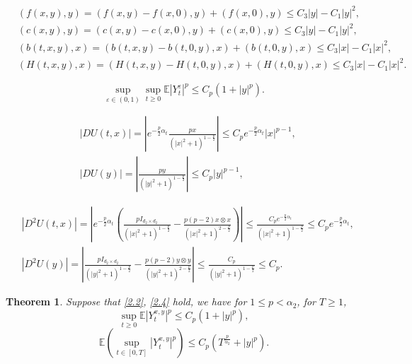\documentclass[10pt,a4paper]{amsart}
\newtheorem{theorem}{Theorem}
\begin{document}
\begin{equation}\label{2.4}
	\begin{split}
		&( f(x,y),y )=( f(x,y)-f(x,0), y ) + (f(x,0),y)  \leq C_{3}|y|-C_{1}|y|^{2},\\
		&( c(x,y),y )=( c(x,y)-c(x,0), y ) +( c(x,0),y ) \leq C_{3}|y|-C_{1}|y|^{2},\\
		& (b(t,x,y),x) = (b(t,x,y)-b(t,0,y), x ) + (b(t,0,y),x)  \leq C_{3}|x|-C_{1}|x|^{2},\\
		& (H(t,x,y),x) = (H(t,x,y)-H(t,0,y), x) + (H(t,0,y),x)  \leq C_{3}|x|-C_{1}|x|^{2}.
	\end{split}
\end{equation}		

	\begin{equation}\label{3.6}
		\sup_{\varepsilon\in (0,1)}\sup_{t\geq0}\mathbb{E} |Y_{t}^{\varepsilon}|^{p}\leq  C_{p}(1+|y|^{p}).
	\end{equation}

	\begin{equation}\label{du}
		\begin{split}
			&|DU(t,x)|=\left| e^{-\frac{p}{2}\alpha_{t}} \frac{px}{(|x|^{2}+1)^{1-\frac{p}{2}}}\right|\leq C_{p} e^{-\frac{p}{2}\alpha_{t}}|x|^{p-1},\\
			& |DU(y)|=\left|  \frac{py}{(|y|^{2}+1)^{1-\frac{p}{2}}}\right|\leq C_{p} |y|^{p-1},
				\end{split}
		\end{equation}

	\begin{equation}\label{d2u}
	\begin{split}
			&|D^{2}U(t,x)|=\left| e^{-\frac{p}{2}\alpha_{t}}\left(  \frac{pI_{d_{2}\times d_{2} }}{(|x|^{2}+1)^{1-\frac{p}{2}}}-\frac{p(p-2)x\otimes x}{(|x|^{2}+1)^{2-\frac{p}{2}}}\right) \right|\leq \frac{C_{p}e^{-\frac{p}{2}\alpha_{t}}}{(|x|^{2}+1)^{1-\frac{p}{2}}}\leq C_{p}e^{-\frac{p}{2}\alpha_{t}},\\
			&|D^{2}U(y)|=\left|   \frac{pI_{d_{2}\times d_{2} }}{(|y|^{2}+1)^{1-\frac{p}{2}}}-\frac{p(p-2)y\otimes y}{(|y|^{2}+1)^{2-\frac{p}{2}}} \right|\leq \frac{C_{p}}{(|y|^{2}+1)^{1-\frac{p}{2}}}\leq C_{p}.
		\end{split}
	\end{equation}

\begin{theorem}\label{T41}
	Suppose that \eqref{2.2}, \eqref{2.4} hold, we have for $1\leq p<\alpha_{2}$, for $T\geq 1$,
	\begin{equation}\label{4.4}
	\sup_{t\geq0} \mathbb{E}|Y_{t}^{ x,y}|^{p}\leq C_{p}(1+|y|^{p}),
	\end{equation}
	\begin{equation}\label{4.5}
		\mathbb{E}\left(\sup_{t\in [0,T]} |Y_{t}^{ x,y}|^{p}\right)\leq C_{p}(T^{\frac{p}{\alpha_{2}}}+|y|^{p}).
	\end{equation}
\end{theorem}
\end{document}
